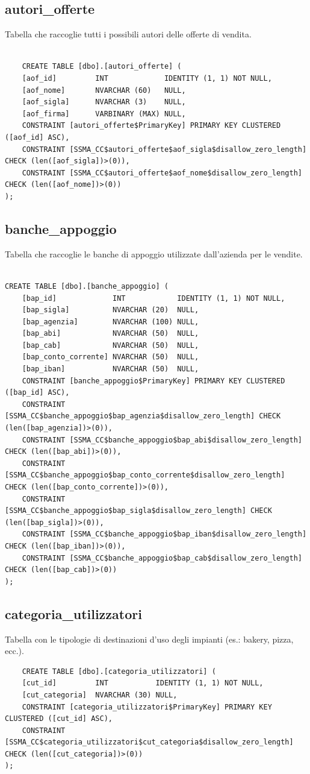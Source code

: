\documentclass[12pt]{article}
\begin{document}
\subsection{autori\_offerte}
Tabella che raccoglie tutti i possibili autori delle offerte di vendita.
\begin{lstlisting}

    CREATE TABLE [dbo].[autori_offerte] (
    [aof_id]         INT             IDENTITY (1, 1) NOT NULL,
    [aof_nome]       NVARCHAR (60)   NULL,
    [aof_sigla]      NVARCHAR (3)    NULL,
    [aof_firma]      VARBINARY (MAX) NULL,
    CONSTRAINT [autori_offerte$PrimaryKey] PRIMARY KEY CLUSTERED ([aof_id] ASC),
    CONSTRAINT [SSMA_CC$autori_offerte$aof_sigla$disallow_zero_length] CHECK (len([aof_sigla])>(0)),
    CONSTRAINT [SSMA_CC$autori_offerte$aof_nome$disallow_zero_length] CHECK (len([aof_nome])>(0))
);
\end{lstlisting}


\subsection{banche\_appoggio}
Tabella che raccoglie le banche di appoggio utilizzate dall'azienda per le vendite.
\begin{lstlisting}

CREATE TABLE [dbo].[banche_appoggio] (
    [bap_id]             INT            IDENTITY (1, 1) NOT NULL,
    [bap_sigla]          NVARCHAR (20)  NULL,
    [bap_agenzia]        NVARCHAR (100) NULL,
    [bap_abi]            NVARCHAR (50)  NULL,
    [bap_cab]            NVARCHAR (50)  NULL,
    [bap_conto_corrente] NVARCHAR (50)  NULL,
    [bap_iban]           NVARCHAR (50)  NULL,
    CONSTRAINT [banche_appoggio$PrimaryKey] PRIMARY KEY CLUSTERED ([bap_id] ASC),
    CONSTRAINT [SSMA_CC$banche_appoggio$bap_agenzia$disallow_zero_length] CHECK (len([bap_agenzia])>(0)),
    CONSTRAINT [SSMA_CC$banche_appoggio$bap_abi$disallow_zero_length] CHECK (len([bap_abi])>(0)),
    CONSTRAINT [SSMA_CC$banche_appoggio$bap_conto_corrente$disallow_zero_length] CHECK (len([bap_conto_corrente])>(0)),
    CONSTRAINT [SSMA_CC$banche_appoggio$bap_sigla$disallow_zero_length] CHECK (len([bap_sigla])>(0)),
    CONSTRAINT [SSMA_CC$banche_appoggio$bap_iban$disallow_zero_length] CHECK (len([bap_iban])>(0)),
    CONSTRAINT [SSMA_CC$banche_appoggio$bap_cab$disallow_zero_length] CHECK (len([bap_cab])>(0))
);
\end{lstlisting}

\subsection{categoria\_utilizzatori}
Tabella con le tipologie di destinazioni d'uso degli impianti (es.: bakery, pizza, ecc.).
\begin{lstlisting}
    CREATE TABLE [dbo].[categoria_utilizzatori] (
    [cut_id]         INT           IDENTITY (1, 1) NOT NULL,
    [cut_categoria]  NVARCHAR (30) NULL,
    CONSTRAINT [categoria_utilizzatori$PrimaryKey] PRIMARY KEY CLUSTERED ([cut_id] ASC),
    CONSTRAINT [SSMA_CC$categoria_utilizzatori$cut_categoria$disallow_zero_length] CHECK (len([cut_categoria])>(0))
);

\end{lstlisting}
\end{document}
